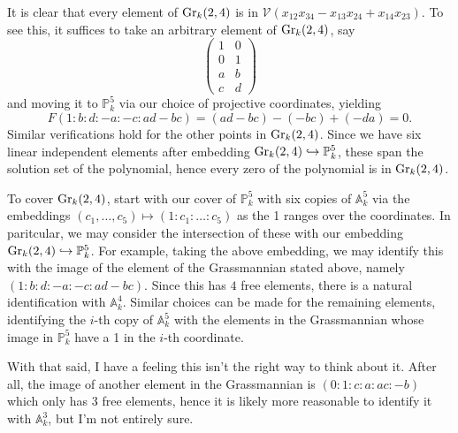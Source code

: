 \documentclass[../../master.tex]{subfiles}
\begin{document}
\begin{solution}
    It is clear that every element of $\operatorname{Gr}_k(2, 4)$ is in $\mathscr{V}(x_{12} x_{34} - x_{13} x_{24} + x_{14} x_{23})$.
    To see this, it suffices to take an arbitrary element of $\operatorname{Gr}_k(2, 4)$, say
    \[
    \begin{pmatrix}
        1 & 0 \\
        0 & 1 \\
        a & b \\
        c & d
    \end{pmatrix}
    \]
    and moving it to $\mathbb{P}_k^{5}$ via our choice of projective coordinates, yielding
    \[
    F(1 : b : d : -a : -c : ad - bc) = (ad - bc) - (-bc) + (-da) = 0.
    \]
    Similar verifications hold for the other points in $\operatorname{Gr}_k(2, 4)$.
    Since we have six linear independent elements after embedding $\operatorname{Gr}_k(2, 4) \hookrightarrow \mathbb{P}_k^{5}$, these span the solution set of the polynomial, hence every zero of the polynomial is in $\operatorname{Gr}_k(2, 4)$.

    To cover $\operatorname{Gr}_k(2, 4)$, start with our cover of $\mathbb{P}_k^{5}$ with six copies of $\mathbb{A}_k^{5}$ via the embeddings $(c_1, \ldots, c_5) \mapsto (1 : c_1 : \ldots : c_5)$ as the 1 ranges over the coordinates.
    In paritcular, we may consider the intersection of these with our embedding $\operatorname{Gr}_k(2, 4) \hookrightarrow \mathbb{P}_k^{5}$.
    For example, taking the above embedding, we may identify this with the image of the element of the Grassmannian stated above, namely $(1 : b : d : -a : -c : ad - bc)$.
    Since this has $4$ free elements, there is a natural identification with $\mathbb{A}_k^{4}$.
    Similar choices can be made for the remaining elements, identifying the $i$-th copy of $\mathbb{A}_k^{5}$ with the elements in the Grassmannian whose image in $\mathbb{P}_k^{5}$ have a 1 in the $i$-th coordinate.

    With that said, I have a feeling this isn't the right way to think about it.
    After all, the image of another element in the Grassmannian is $(0 : 1 : c : a : ac : -b)$ which only has 3 free elements, hence it is likely more reasonable to identify it with $\mathbb{A}_k^{3}$, but I'm not entirely sure.
\end{solution}
\end{document}
